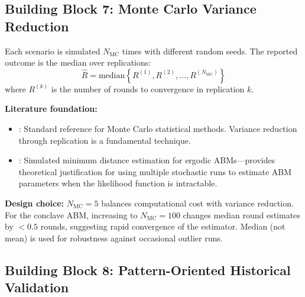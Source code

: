 \subsection{Building Block 7: Monte Carlo Variance Reduction}
\label{sec:bp-montecarlo}

\begin{tcolorbox}[colback=blue!3!white, colframe=blue!60!black, title=Axiom VTM-7: Stochastic Replication]
Each scenario is simulated $N_{\text{MC}}$ times with different random seeds.
The reported outcome is the median over replications:
\begin{equation}
\hat{R} = \text{median}\left\{R^{(1)}, R^{(2)}, \ldots, R^{(N_{\text{MC}})}\right\}
\label{eq:mc}
\end{equation}
where $R^{(k)}$ is the number of rounds to convergence in replication $k$.
\end{tcolorbox}

\textbf{Literature foundation:}
\begin{itemize}[nosep]
\item \citet{robert2004monte}: Standard reference for Monte Carlo statistical methods.
      Variance reduction through replication is a fundamental technique.
\item \citet{grazzini2015estimation}: Simulated minimum distance estimation for
      ergodic ABMs---provides theoretical justification for using multiple stochastic
      runs to estimate ABM parameters when the likelihood function is intractable.
\end{itemize}

\textbf{Design choice:} $N_{\text{MC}} = 5$ balances computational cost with variance
reduction. For the conclave ABM, increasing to $N_{\text{MC}} = 100$ changes median
round estimates by $< 0.5$ rounds, suggesting rapid convergence of the estimator.
Median (not mean) is used for robustness against occasional outlier runs.


\subsection{Building Block 8: Pattern-Oriented Historical Validation}
\label{sec:bp-validation}

